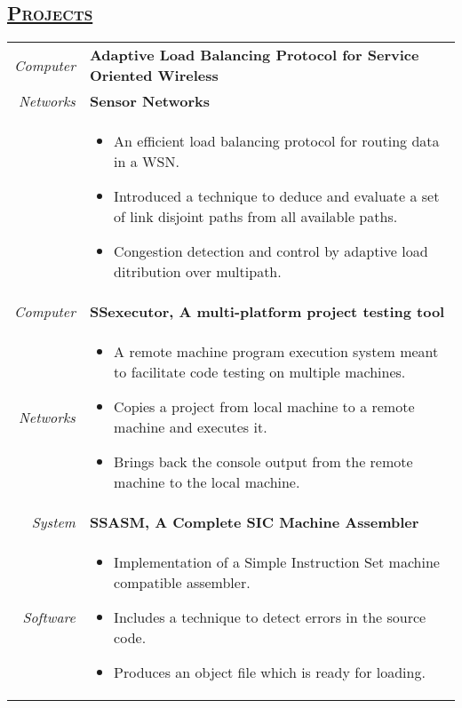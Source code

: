 \documentclass[14pt]{article}
\begin{document}
\subsection* {\scshape\LARGE\uline {Projects}}
\begin{tabularx}{\textwidth}{r X}
\emph{Computer} & \textbf{Adaptive Load Balancing Protocol for Service Oriented Wireless} \\
\emph{Networks} & \textbf{Sensor Networks} \\
                             & \begin{itemize}[noitemsep,topsep=0pt]
						\item  An efficient load balancing protocol for routing data in a WSN. 
                             	\item Introduced a technique to deduce and evaluate a set of link disjoint paths from all available paths. 
				   		\item Congestion detection and control by adaptive load ditribution over multipath. 
						\end{itemize}
\\
\emph{Computer} & \textbf{SSexecutor, A multi-platform project testing tool} \\
\emph{Networks} & \begin{itemize}[noitemsep,topsep=0pt] 
					  \item A remote machine program execution system meant to facilitate code testing on multiple machines. 
                             \item Copies a project from local machine to a remote machine and executes it. 
				   	  \item Brings back the console output from the remote machine to the local machine. 
					  \end{itemize}
\\
\emph{System} & \textbf{SSASM, A Complete SIC Machine Assembler} \\
\emph{Software} & \begin{itemize}[noitemsep,topsep=0pt]
					  \item Implementation of a Simple Instruction Set machine compatible assembler. 
					  \item Includes a technique to detect errors in the source code. 
					  \item Produces an object file which is ready for loading. 
					  \end{itemize}
\end{tabularx}
\end{document}
